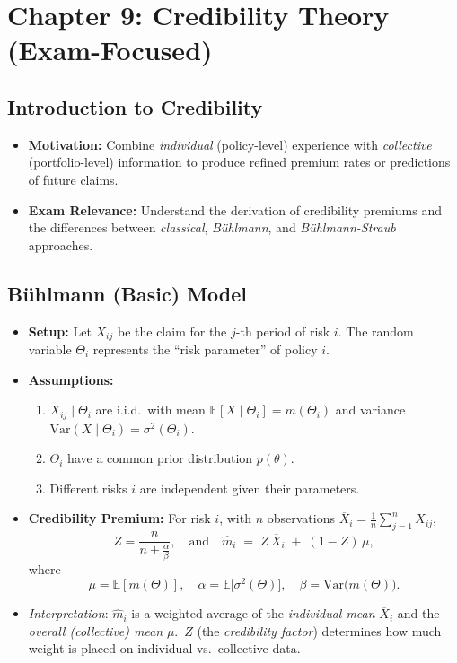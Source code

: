 \documentclass[13pt,a4paper]{article}
\begin{document}
\section{Chapter 9: Credibility Theory (Exam-Focused)}
\label{sec:chapter9}

\subsection{Introduction to Credibility}
\begin{itemize}
  \item \textbf{Motivation:} Combine \emph{individual} (policy-level) experience with \emph{collective} (portfolio-level) information to produce refined premium rates or predictions of future claims.
  \item \textbf{Exam Relevance:} Understand the derivation of credibility premiums and the differences between \emph{classical}, \emph{B\"{u}hlmann}, and \emph{B\"{u}hlmann-Straub} approaches.
\end{itemize}

\subsection{B\"{u}hlmann (Basic) Model}
\begin{itemize}
  \item \textbf{Setup:} Let \(X_{ij}\) be the claim for the \(j\)-th period of risk \(i\). The random variable \(\Theta_i\) represents the “risk parameter” of policy \(i\).
  \item \textbf{Assumptions:}
    \begin{enumerate}
      \item \(X_{ij}\mid \Theta_i\) are i.i.d.\ with mean \(\mathbb{E}[X\mid\Theta_i]=m(\Theta_i)\) and variance \(\mathrm{Var}(X \mid \Theta_i)=\sigma^2(\Theta_i)\).
      \item \(\Theta_i\) have a common prior distribution \(p(\theta)\).
      \item Different risks \(i\) are independent given their parameters.
    \end{enumerate}
  \item \textbf{Credibility Premium:} For risk \(i\), with \(n\) observations \(\overline{X}_i = \frac{1}{n}\sum_{j=1}^n X_{ij}\),
  \[
    Z = \frac{n}{n + \frac{\alpha}{\beta}}, 
    \quad \text{and}\quad 
    \hat{m}_i \;=\; Z\,\overline{X}_i \;+\; (1-Z)\,\mu,
  \]
  where
  \[
    \mu = \mathbb{E}[m(\Theta)], 
    \quad
    \alpha = \mathbb{E}\bigl[\sigma^2(\Theta)\bigr], 
    \quad
    \beta = \mathrm{Var}\bigl(m(\Theta)\bigr).
  \]
  \item \emph{Interpretation}: \(\hat{m}_i\) is a weighted average of the \emph{individual mean} \(\overline{X}_i\) and the \emph{overall (collective) mean} \(\mu\). 
    \(\,Z\) (the \emph{credibility factor}) determines how much weight is placed on individual vs.\ collective data.
\end{itemize}
\end{document}
